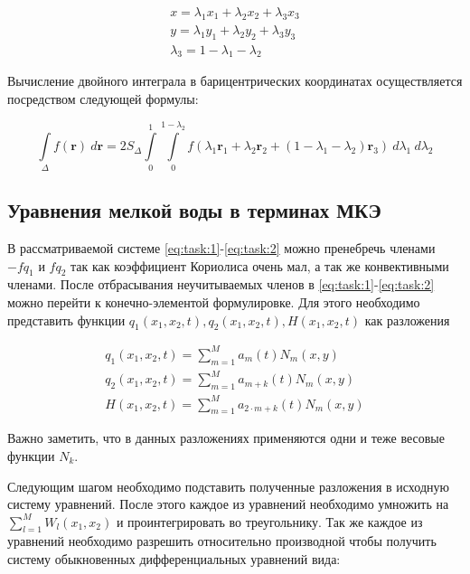 \documentclass[14pt]{extreport}
\begin{document}
\begin{eqnarray}
x = \lambda_{1} x_{1} +  \lambda_{2} x_{2} +  \lambda_{3} x_{3} \\
y = \lambda_{1} y_{1} +  \lambda_{2} y_{2} +  \lambda_{3} y_{3} \\
\lambda_{3} = 1 - \lambda_{1} - \lambda_{2}
\end{eqnarray}


Вычисление двойного интеграла в барицентрических координатах осуществляется посредством следующей формулы\cite{bib:calc:barycentric}:


\begin{equation}
\int\limits_{\Delta} f(\mathbf{r}) \ d\mathbf{r} = 2S_{\Delta} \int\limits_{0}^{1} \int\limits_{0}^{1 - \lambda_{2}} f(\lambda_{1} \mathbf{r}_{1} + \lambda_{2} \mathbf{r}_{2} +
(1 - \lambda_{1} - \lambda_{2}) \mathbf{r}_{3}) \ d\lambda_{1} \ d\lambda_{2}
\end{equation}


\subsection{Уравнения мелкой воды в терминах МКЭ}

В рассматриваемой системе \ref{eq:task:1}-\ref{eq:task:2} можно пренебречь членами $-fq_{1}$ и $fq_2$ так как коэффициент Кориолиса очень мал, а так же конвективными членами. После отбрасывания неучитываемых членов в \ref{eq:task:1}-\ref{eq:task:2} можно перейти к конечно-элементой формулировке. Для этого необходимо представить функции $q_1(x_1, x_2,t) , q_2(x_1, x_2,t), H(x_1, x_2,t)$ как разложения

\begin{eqnarray}\label{eq:fem:1}
q_1(x_1, x_2, t) = \sum\limits_{m=1}^{M} a_m(t)N_m(x, y) \\
q_2(x_1, x_2, t) = \sum\limits_{m=1}^{M} a_{m+k}(t)N_m(x, y) \\
H(x_1, x_2, t) = \sum\limits_{m=1}^{M} a_{2\cdot m+k}(t)N_m(x, y)
\end{eqnarray}

Важно заметить, что в данных разложениях применяются одни и теже весовые функции $N_k$.

Следующим шагом необходимо подставить полученные разложения в исходную систему уравнений. После этого каждое из уравнений необходимо умножить на $\sum\limits_{l=1}^{M} W_l(x_1, x_2)$ и проинтегрировать во треугольнику. Так же каждое из уравнений необходимо разрешить относительно производной чтобы получить систему обыкновенных дифференциальных уравнений вида:
\end{document}
